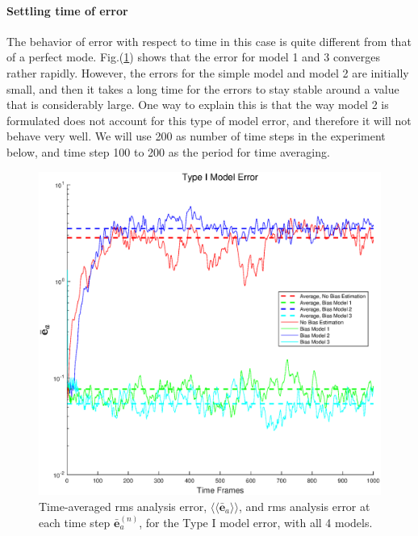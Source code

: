 \documentclass[twocolumn]{article}
\begin{document}
\paragraph{Settling time of error}
The behavior of error with respect to time in this case is quite different from that of a perfect mode. Fig.(\ref{ErrVsTimeM1.1}) shows that the error for model 1 and 3 converges rather rapidly. However, the errors for the simple model and model 2 are initially small, and then it takes a long time for the errors to stay stable around a value that is considerably large. One way to explain this is that the way model 2 is formulated does not account for this type of model error, and therefore it will not behave very well. We will use 200 as number of time steps in the experiment below, and time step 100 to 200 as the period for time averaging.
\begin{figure} 
\centering
\includegraphics[scale=0.3]{Figures/ErrVsTimeM1_1}
\caption{Time-averaged rms analysis error, $\langle\langle\bar{\pmb{e}}_a\rangle\rangle$, and rms analysis error at each time step $\bar{\pmb{e}}_a^{(n)}$, for the Type I model error, with all 4 models.}
\label{ErrVsTimeM1.1}
\end{figure}
\end{document}
